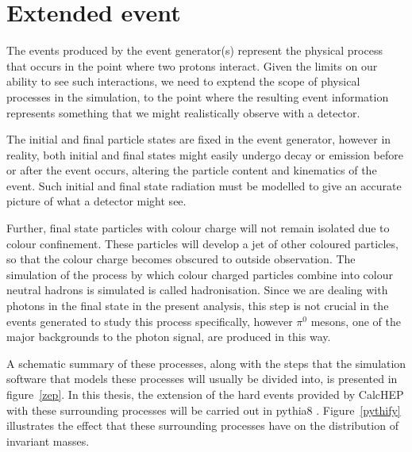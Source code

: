 \section{Extended event}
The events produced by the event generator(s) represent the physical process that occurs in the point where two protons interact. Given the limits on our ability to see such interactions, we need to exptend the scope of physical processes in the simulation, to the point where the resulting event information represents something that we might realistically observe with a detector.

The initial and final particle states are fixed in the event generator, however in reality, both initial and final states might easily undergo decay or emission before or after the event occurs, altering the particle content and kinematics of the event. Such initial and final state radiation must be modelled to give an accurate picture of what a detector might see.

Further, final state particles with colour charge will not remain isolated due to colour confinement. These particles will develop a jet of other coloured particles, so that the colour charge becomes obscured to outside observation. The simulation of the process by which colour charged particles combine into colour neutral hadrons is simulated is called hadronisation. Since we are dealing with photons in the final state in the present analysis, this step is not crucial in the events generated to study this process specifically, however $\pi^0$ mesons, one of the major backgrounds to the photon signal, are produced in this way. 

A schematic summary of these processes, along with the steps that the simulation software that models these processes will usually be divided into, is presented in figure~\ref{zep}. In this thesis, the extension of the hard events provided by CalcHEP with these surrounding processes will be carried out in pythia8 \cite{pythia}. Figure~\ref{pythify} illustrates the effect that these surrounding processes have on the distribution of invariant masses.

